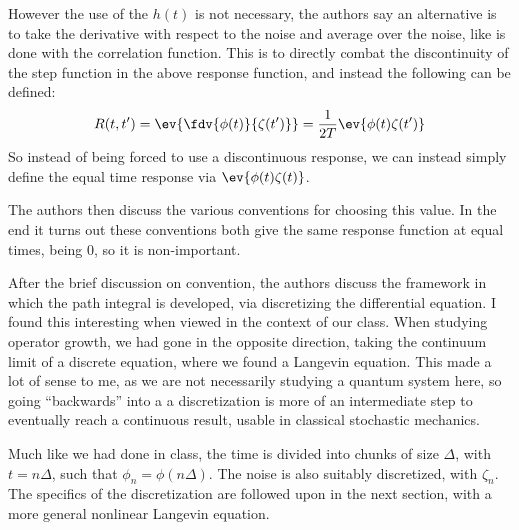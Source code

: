 \documentclass[12pt]{article}
\begin{document}
However the use of the $h(t)$ is not necessary, the authors say an alternative is to take the derivative with respect to the noise and average over the noise, like is done with the correlation function. This is to directly combat the discontinuity of the step function in the above response function, and instead the following can be defined:
\begin{align*}
  R(t,t')=\ev{\fdv{\phi(t)}{\zeta(t')}}=\frac1{2T}\ev{\phi(t)\zeta(t')}
\end{align*}
So instead of being forced to use a discontinuous response, we can instead simply define the equal time response via $\ev{\phi(t)\zeta(t)}$.

The authors then discuss the various conventions for choosing this value. In the end it turns out these conventions both give the same response function at equal times, being $0$, so it is non-important.

After the brief discussion on convention, the authors discuss the framework in which the path integral is developed, via discretizing the differential equation. I found this interesting when viewed in the context of our class. When studying operator growth, we had gone in the opposite direction, taking the continuum limit of a discrete equation, where we found a Langevin equation. This made a lot of sense to me, as we are not necessarily studying a quantum system here, so going ``backwards'' into a a discretization is more of an intermediate step to eventually reach a continuous result, usable in classical stochastic mechanics.

Much like we had done in class, the time is divided into chunks of size $\Delta$, with $t=n\Delta$, such that $\phi_n=\phi(n\Delta)$. The noise is also suitably discretized, with $\zeta_n$. The specifics of the discretization are followed upon in the next section, with a more general nonlinear Langevin equation.
\end{document}
